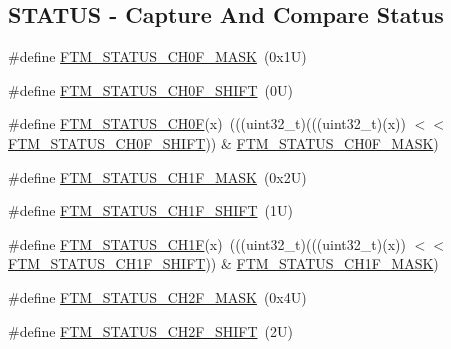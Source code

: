 \subsection*{S\+T\+A\+T\+US -\/ Capture And Compare Status}
\begin{DoxyCompactItemize}
\item 
\#define \mbox{\hyperlink{group___f_t_m___register___masks_ga9ba703f87542e033b6c311c061ea9187}{F\+T\+M\+\_\+\+S\+T\+A\+T\+U\+S\+\_\+\+C\+H0\+F\+\_\+\+M\+A\+SK}}~(0x1\+U)
\item 
\#define \mbox{\hyperlink{group___f_t_m___register___masks_ga4ea6740087a54ad02b40e7cf909f92aa}{F\+T\+M\+\_\+\+S\+T\+A\+T\+U\+S\+\_\+\+C\+H0\+F\+\_\+\+S\+H\+I\+FT}}~(0\+U)
\item 
\#define \mbox{\hyperlink{group___f_t_m___register___masks_gaea84608cacf9d428af32ffad31f07563}{F\+T\+M\+\_\+\+S\+T\+A\+T\+U\+S\+\_\+\+C\+H0F}}(x)~(((uint32\+\_\+t)(((uint32\+\_\+t)(x)) $<$$<$ \mbox{\hyperlink{group___f_t_m___register___masks_ga4ea6740087a54ad02b40e7cf909f92aa}{F\+T\+M\+\_\+\+S\+T\+A\+T\+U\+S\+\_\+\+C\+H0\+F\+\_\+\+S\+H\+I\+FT}})) \& \mbox{\hyperlink{group___f_t_m___register___masks_ga9ba703f87542e033b6c311c061ea9187}{F\+T\+M\+\_\+\+S\+T\+A\+T\+U\+S\+\_\+\+C\+H0\+F\+\_\+\+M\+A\+SK}})
\item 
\#define \mbox{\hyperlink{group___f_t_m___register___masks_gaf99cd78b57a27e6aa5fea6b587dc4e5f}{F\+T\+M\+\_\+\+S\+T\+A\+T\+U\+S\+\_\+\+C\+H1\+F\+\_\+\+M\+A\+SK}}~(0x2\+U)
\item 
\#define \mbox{\hyperlink{group___f_t_m___register___masks_gaae55718a94e09af32a6596131a1b7e45}{F\+T\+M\+\_\+\+S\+T\+A\+T\+U\+S\+\_\+\+C\+H1\+F\+\_\+\+S\+H\+I\+FT}}~(1\+U)
\item 
\#define \mbox{\hyperlink{group___f_t_m___register___masks_gad9335dea9b1d091d355a7c5a945721d2}{F\+T\+M\+\_\+\+S\+T\+A\+T\+U\+S\+\_\+\+C\+H1F}}(x)~(((uint32\+\_\+t)(((uint32\+\_\+t)(x)) $<$$<$ \mbox{\hyperlink{group___f_t_m___register___masks_gaae55718a94e09af32a6596131a1b7e45}{F\+T\+M\+\_\+\+S\+T\+A\+T\+U\+S\+\_\+\+C\+H1\+F\+\_\+\+S\+H\+I\+FT}})) \& \mbox{\hyperlink{group___f_t_m___register___masks_gaf99cd78b57a27e6aa5fea6b587dc4e5f}{F\+T\+M\+\_\+\+S\+T\+A\+T\+U\+S\+\_\+\+C\+H1\+F\+\_\+\+M\+A\+SK}})
\item 
\#define \mbox{\hyperlink{group___f_t_m___register___masks_gab75f4d4d1939e42385d1feb59b1eb363}{F\+T\+M\+\_\+\+S\+T\+A\+T\+U\+S\+\_\+\+C\+H2\+F\+\_\+\+M\+A\+SK}}~(0x4\+U)
\item 
\#define \mbox{\hyperlink{group___f_t_m___register___masks_ga94df65cce2bfdcf540b7870192e1e5ae}{F\+T\+M\+\_\+\+S\+T\+A\+T\+U\+S\+\_\+\+C\+H2\+F\+\_\+\+S\+H\+I\+FT}}~(2\+U)

\end{DoxyCompactItemize}
